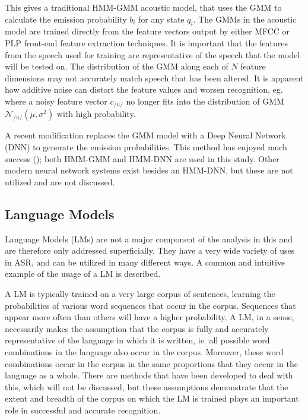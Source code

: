 This gives a traditional HMM-GMM acoustic model, that uses the GMM to calculate the emission probability $b_i$ for any state $q_i$.  The GMMs in the acoustic model are trained directly from the feature vectors output by either MFCC or PLP front-end feature extraction techniques.  It is important that the features from the speech used for training are representative of the speech that the model will be tested on.  The distribution of the GMM along each of $N$ feature dimensions may not accurately match speech that has been altered.  It is apparent how additive noise can distort the feature values and worsen recognition, eg. where a noisy feature vector $c_{/u/}$ no longer fits into the distribution of GMM $\mathcal{N}_{/u/}(\mu,\sigma^2)$ with high probability.

A recent modification replaces the GMM model with a Deep Neural Network (DNN) to generate the emission probabilities. This method has enjoyed much success (\cite{zhang:17}); both HMM-GMM and HMM-DNN are used in this study.  Other modern neural network systems exist besides an HMM-DNN, but these are not utilized and are not discussed.





\DIFdelbegin \subsubsection{}
\addtocounter{subsubsection}{-1}%
\DIFdelend \DIFaddbegin \subsection{Language Models}\label{sec:lang-mod}
\DIFaddend 

Language Models (LMs) are not a major component of the analysis in this \DIFdelbegin {}\DIFdelend \DIFaddbegin {}\DIFaddend and are therefore only addressed superficially.  They have a very wide variety of uses in ASR, and can be utilized in many different ways.  A common and intuitive example of the usage of a LM is described.

A LM is typically trained on a very large corpus of sentences, learning the probabilities of various word sequences that occur in the corpus.  Sequences that appear more often than others will have a higher probability.  A LM, in a sense, necessarily makes the assumption that the corpus is fully and accurately representative of the language in which it is written, ie. all possible word combinations in the language also occur in the corpus. Moreover, these word combinations occur in the corpus in the same proportions that they occur in the language as a whole.  There are methods that have been developed to deal with this, which will not be discussed, but these assumptions demonstrate that the extent and breadth of the corpus on which the LM is trained plays an important role in successful and accurate recognition.  

